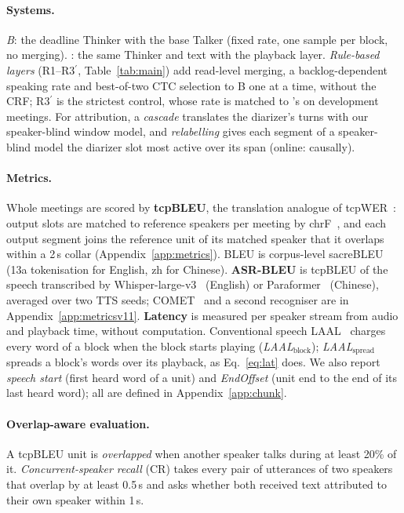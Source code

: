 \paragraph{Systems.} \emph{B}: the deadline Thinker with the base Talker (fixed rate, one sample per block, no
merging). \emph{\sys{}}: the same Thinker and text with the playback layer. \emph{Rule-based layers} (R1--R3$^\prime$,
Table~\ref{tab:main}) add read-level merging, a backlog-dependent speaking rate and best-of-two CTC selection to B one
at a time, without the CRF; R3$^\prime$ is the strictest control, whose rate is matched to \sys{}'s on development
meetings. For attribution, a \emph{cascade} translates the diarizer's turns with our speaker-blind window model, and
\emph{relabelling} gives each segment of a speaker-blind model the diarizer slot most active over its span (online:
causally).

\paragraph{Metrics.} Whole meetings are scored by \textbf{tcpBLEU}, the translation analogue of
tcpWER~\citep{neumann2023meeteval}: output slots are matched to reference speakers per meeting by
chrF~\citep{popovic2015chrf}, and each output segment joins the reference unit of its matched speaker that it overlaps
within a 2\,s collar (Appendix~\ref{app:metrics}). BLEU is corpus-level sacreBLEU~\citep{post2018call} (13a
tokenisation for English, zh for Chinese). \textbf{ASR-BLEU} is tcpBLEU of the speech transcribed by
Whisper-large-v3~\citep{radford2023robust} (English) or Paraformer~\citep{gao2022paraformer} (Chinese), averaged over
two TTS seeds\ifMetricsV{}; COMET~\citep{rei2022comet} and a second recogniser are in Appendix~\ref{app:metricsv11}\fi.
\textbf{Latency} is measured per speaker stream from audio and playback time, without computation. Conventional speech
LAAL~\citep{papi2022over} charges every word of a block when the block starts playing (\emph{LAAL$_\text{block}$});
\emph{LAAL$_\text{spread}$} spreads a block's words over its playback, as Eq.~\eqref{eq:lat} does. We also report
\emph{speech start} (first heard word of a unit) and \emph{EndOffset} (unit end to the end of its last heard word);
all are defined in Appendix~\ref{app:chunk}.

\paragraph{Overlap-aware evaluation.}
\label{sec:eval-overlap}
A tcpBLEU unit is \emph{overlapped} when another speaker talks during at least 20\% of it. \emph{Concurrent-speaker
recall} (CR) takes every pair of utterances of two speakers that overlap by at least 0.5\,s and asks whether both
received text attributed to their own speaker within 1\,s.

